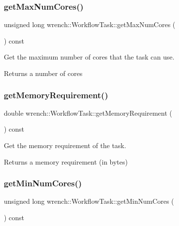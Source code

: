 \subsubsection{\texorpdfstring{get\+Max\+Num\+Cores()}{getMaxNumCores()}}
{\footnotesize\ttfamily unsigned long wrench\+::\+Workflow\+Task\+::get\+Max\+Num\+Cores (\begin{DoxyParamCaption}{ }\end{DoxyParamCaption}) const}



Get the maximum number of cores that the task can use. 

\begin{DoxyReturn}{Returns}
a number of cores 
\end{DoxyReturn}
\mbox{\label{classwrench_1_1_workflow_task_aeafc6e6f0bce5853a3fd1e4818638908}} 
\subsubsection{\texorpdfstring{get\+Memory\+Requirement()}{getMemoryRequirement()}}
{\footnotesize\ttfamily double wrench\+::\+Workflow\+Task\+::get\+Memory\+Requirement (\begin{DoxyParamCaption}{ }\end{DoxyParamCaption}) const}



Get the memory requirement of the task. 

\begin{DoxyReturn}{Returns}
a memory requirement (in bytes) 
\end{DoxyReturn}
\mbox{\label{classwrench_1_1_workflow_task_a05d06d1988745735016dcf19d38e2398}} 
\subsubsection{\texorpdfstring{get\+Min\+Num\+Cores()}{getMinNumCores()}}
{\footnotesize\ttfamily unsigned long wrench\+::\+Workflow\+Task\+::get\+Min\+Num\+Cores (\begin{DoxyParamCaption}{ }\end{DoxyParamCaption}) const}



